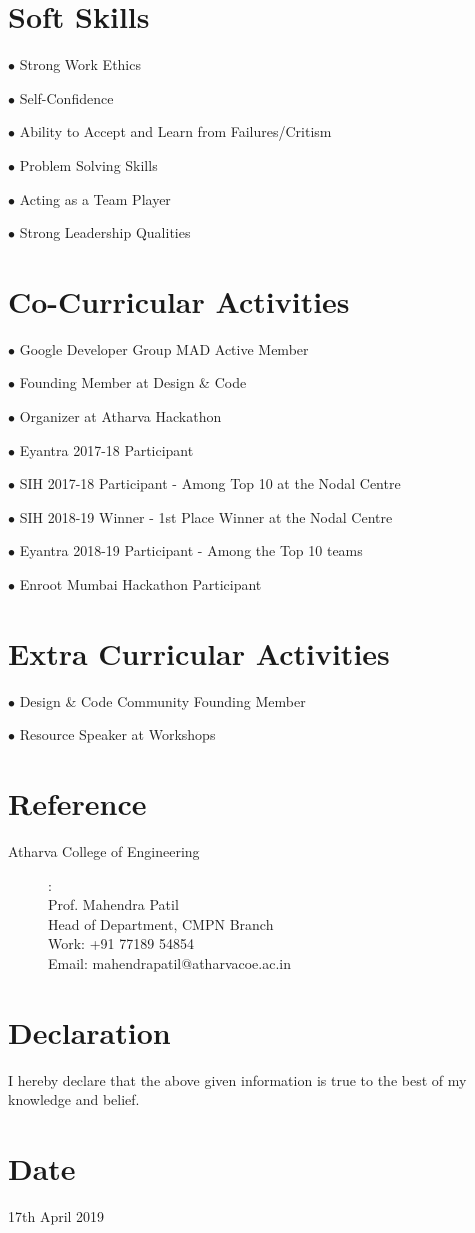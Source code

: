 \documentclass[11pt]{article}
\begin{document}
\section{Soft Skills}
\begin{description} 
\item{$\bullet$ Strong Work Ethics}
\item {$\bullet$ Self-Confidence}
\item {$\bullet$ Ability to Accept and Learn from Failures/Critism}
\item {$\bullet$ Problem Solving Skills}
\item {$\bullet$ Acting as a Team Player}
\item {$\bullet$ Strong Leadership Qualities}
\end{description}

\section{Co-Curricular Activities}
\begin{description}
\item {$\bullet$ Google Developer Group MAD Active Member}
\item {$\bullet$ Founding Member at Design \& Code}
\item {$\bullet$ Organizer at Atharva Hackathon}
\item {$\bullet$ Eyantra 2017-18 Participant}
\item {$\bullet$ SIH 2017-18 Participant - Among Top 10 at the Nodal Centre}
\item {$\bullet$ SIH 2018-19 Winner - 1st Place Winner at the Nodal Centre}
\item {$\bullet$ Eyantra 2018-19 Participant - Among the Top 10 teams}
\item {$\bullet$ Enroot Mumbai Hackathon Participant}
\end{description}
\section{Extra Curricular Activities}
\begin{description}
\item {$\bullet$ Design \& Code Community Founding Member}
\item {$\bullet$ Resource Speaker at Workshops}
\end{description}
\section{Reference}
\begin{description}
    \item[Atharva College of Engineering]:\\
    Prof. Mahendra Patil\\
    Head of Department, CMPN Branch\\
Work: +91 77189 54854\\
Email:  mahendrapatil@atharvacoe.ac.in 

\end{description}

\section{Declaration}
I hereby declare that the above given information is true to the best of my knowledge and belief.   
\section{Date}
17th April 2019
\end{document}
